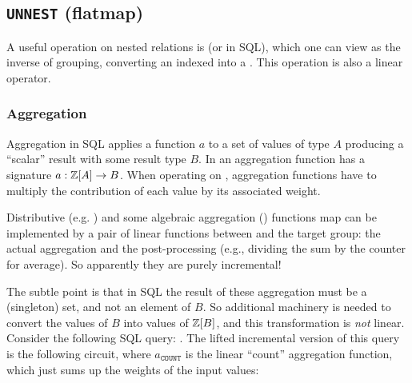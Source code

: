 \subsection{\texttt{UNNEST} (flatmap)}

A useful operation on nested relations is  (or
 in SQL), which one can view as the inverse of grouping,
converting an indexed \zr into a \zr.  This operation is also a linear
\dbsp operator.

\subsubsection{Aggregation}\label{sec:aggregation}

Aggregation in SQL applies a function $a$ to a set of values of type
$A$ producing a ``scalar'' result with some result type $B$.  In \dbsp
an aggregation function has a signature $a: \mathbb{Z}[A] \to B$.  When
operating on \zrs, aggregation functions have to multiply the
contribution of each value by its associated weight.

Distributive (e.g. ) and some algebraic aggregation
() functions map can be implemented by a pair of linear
functions between \zrs and the target group: the actual aggregation
and the post-processing (e.g., dividing the sum by the counter for
average).  So apparently they are purely incremental!

The subtle point is that in SQL the result of these aggregation must
be a (singleton) set, and not an element of $B$.  So additional
machinery is needed to convert the values of $B$ into values of
$\mathbb{Z}[B]$, and this transformation is \emph{not} linear.  Consider the
following SQL query: .  The lifted
incremental version of this query is the following circuit, where
$a_\texttt{COUNT}$ is the linear ``count'' aggregation function, which
just sums up the weights of the input values:



